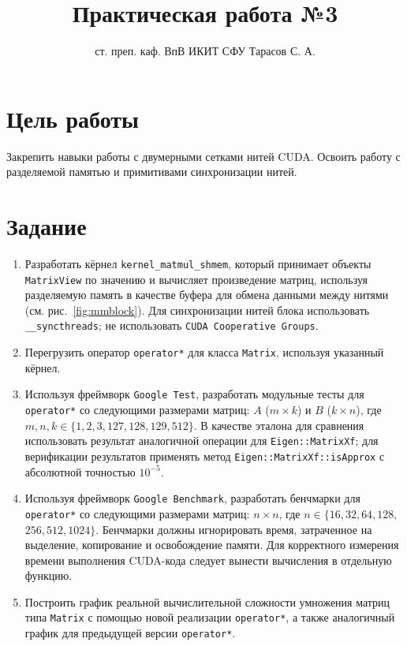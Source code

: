 \documentclass[12pt]{article}
\title{Практическая работа №3}
\author{ст. преп. каф. ВпВ ИКИТ СФУ Тарасов С. А.}
\date{}
\begin{document}
\maketitle

\section*{Цель работы}
Закрепить навыки работы с двумерными сетками нитей CUDA. Освоить работу с разделяемой памятью и примитивами синхронизации нитей.

\section*{Задание}
\begin{enumerate}
    \item Разработать кёрнел \texttt{kernel\_matmul\_shmem}, который принимает объекты \texttt{MatrixView} по значению и вычисляет произведение матриц, используя разделяемую память в качестве буфера для обмена данными между нитями (см. рис.~\ref{fig:mmblock}). Для синхронизации нитей блока использовать \texttt{\_\_syncthreads}; не использовать \texttt{CUDA Cooperative Groups}.

    \item Перегрузить оператор \texttt{operator*} для класса \texttt{Matrix}, используя указанный кёрнел.

    \item Используя фреймворк \texttt{Google Test}, разработать модульные тесты для \texttt{operator*} со следующими размерами матриц: $A$ ($m \times k$) и $B$ ($k \times n$), где $m, n, k \in \{1, 2, 3, 127, 128, 129, 512\}$. В качестве эталона для сравнения использовать результат аналогичной операции для \texttt{Eigen::MatrixXf}; для верификации результатов применять метод \texttt{Eigen::MatrixXf::isApprox} с абсолютной точностью $10^{-5}$.

    \item Используя фреймворк \texttt{Google Benchmark}, разработать бенчмарки для \texttt{operator*} со следующими размерами матриц: $n \times n$, где $n \in \{16, 32, 64, 128,$ $256, 512, 1024\}$. Бенчмарки должны игнорировать время, затраченное на выделение, копирование и освобождение памяти. Для корректного измерения времени выполнения CUDA-кода следует вынести вычисления в отдельную функцию.

    \item Построить график реальной вычислительной сложности умножения матриц типа \texttt{Matrix} с помощью новой реализации \texttt{operator*}, а также аналогичный график для предыдущей версии \texttt{operator*}.


\end{enumerate}
\end{document}
